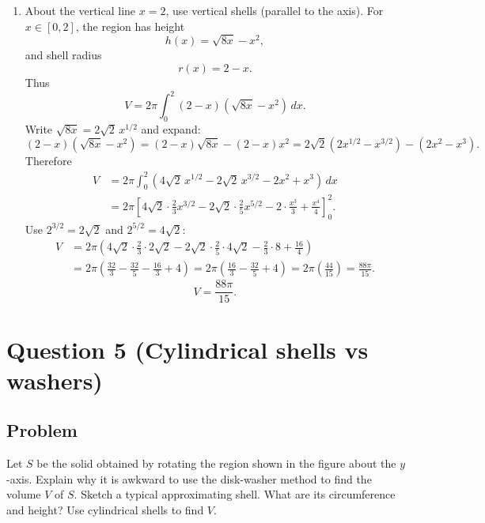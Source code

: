 \documentclass[12pt]{article}
\begin{document}
\begin{enumerate}[label=(\alph*)]
\item About the vertical line \(x=2\), use vertical shells (parallel to the axis).
For \(x\in[0,2]\), the region has height
\[
h(x)=\sqrt{8x}-x^2,
\]
and shell radius
\[
r(x)=2-x.
\]
Thus
\[
V=2\pi\int_{0}^{2} (2-x)\left(\sqrt{8x}-x^2\right)\,dx.
\]
Write \(\sqrt{8x}=2\sqrt{2}\,x^{1/2}\) and expand:
\[
(2-x)\left(\sqrt{8x}-x^2\right)
=
(2-x)\sqrt{8x}-(2-x)x^2
=
2\sqrt{2}(2x^{1/2}-x^{3/2})-(2x^2-x^3).
\]
Therefore
\begin{align*}
V
&=2\pi\int_{0}^{2}\left(4\sqrt{2}\,x^{1/2}-2\sqrt{2}\,x^{3/2}-2x^2+x^3\right)\,dx\\
&=2\pi\left[
4\sqrt{2}\cdot \frac{2}{3}x^{3/2}
-2\sqrt{2}\cdot \frac{2}{5}x^{5/2}
-2\cdot \frac{x^3}{3}
+\frac{x^4}{4}
\right]_{0}^{2}.
\end{align*}
Use \(2^{3/2}=2\sqrt{2}\) and \(2^{5/2}=4\sqrt{2}\):
\begin{align*}
V
&=2\pi\left(
4\sqrt{2}\cdot \frac{2}{3}\cdot 2\sqrt{2}
-2\sqrt{2}\cdot \frac{2}{5}\cdot 4\sqrt{2}
-\frac{2}{3}\cdot 8
+\frac{16}{4}
\right)\\
&=2\pi\left(
\frac{32}{3}
-\frac{32}{5}
-\frac{16}{3}
+4
\right)
=2\pi\left(
\frac{16}{3}-\frac{32}{5}+4
\right)
=2\pi\left(\frac{44}{15}\right)
=\frac{88\pi}{15}.
\end{align*}
\[
\boxed{V=\frac{88\pi}{15}.}
\]
\end{enumerate}

\newpage



\section*{Question 5 (Cylindrical shells vs washers)}

\subsection*{Problem}
Let \(S\) be the solid obtained by rotating the region shown in the figure about the \(y\)-axis. Explain why it is awkward to use the disk-washer method to find the volume \(V\) of \(S\). Sketch a typical approximating shell. What are its circumference and height? Use cylindrical shells to find \(V\).

\medskip

\pgfplotsset{compat=1.18}
\end{document}
